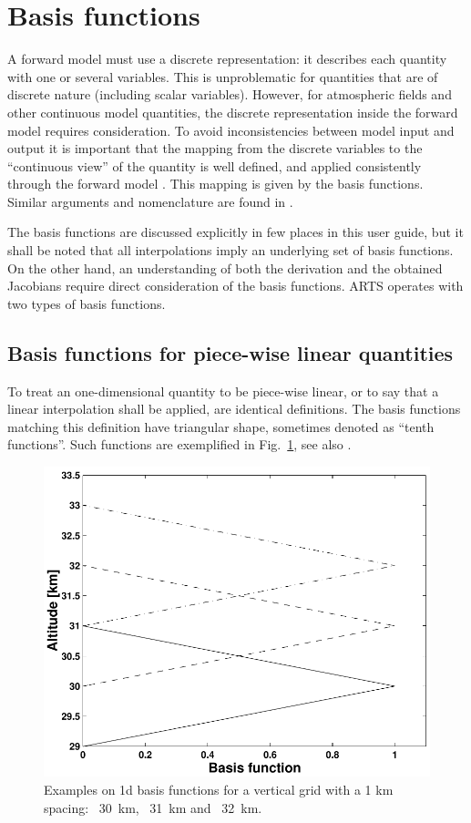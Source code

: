  
\section{Basis functions}
\label{sec:wfuns:basis}

A forward model must use a discrete representation: it describes each quantity
with one or several variables. This is unproblematic for quantities that are of
discrete nature (including scalar variables). However, for atmospheric fields
and other continuous model quantities, the discrete representation inside the
forward model requires consideration. To avoid inconsistencies between model
input and output it is important that the mapping from the discrete variables
to the ``continuous view'' of the quantity is well defined, and applied
consistently through the forward model . This mapping is given by the basis
functions. Similar arguments and nomenclature are found
in \citet{read:thecl:06}.

The basis functions are discussed explicitly in few places in this user guide,
but it shall be noted that all interpolations imply an underlying set of basis
functions. On the other hand, an understanding of both the derivation and the
obtained Jacobians require direct consideration of the basis functions. ARTS
operates with two types of basis functions.




\subsection{Basis functions for piece-wise linear quantities}
\label{sec:wfuns:basis1}
%
To treat an one-dimensional quantity to be piece-wise linear, or to say that a
linear interpolation shall be applied, are identical definitions. The basis
functions matching this definition have triangular shape, sometimes denoted as
``tenth functions''. Such functions are exemplified in
Fig.~\ref{fig:wfuns:zbasis}, see also \citet{buehler:artst:05}.

\begin{figure}[t]
 \begin{center}
  \includegraphics*[width=0.7\hsize]{fig_absbasis_z}
  \caption{Examples on 1d basis functions for a vertical grid with a 1 km
           spacing: \lsolid~30~km, \ldashed~31~km and \ldashdot~32~km.}
  \label{fig:wfuns:zbasis}  
 \end{center}
\end{figure}


